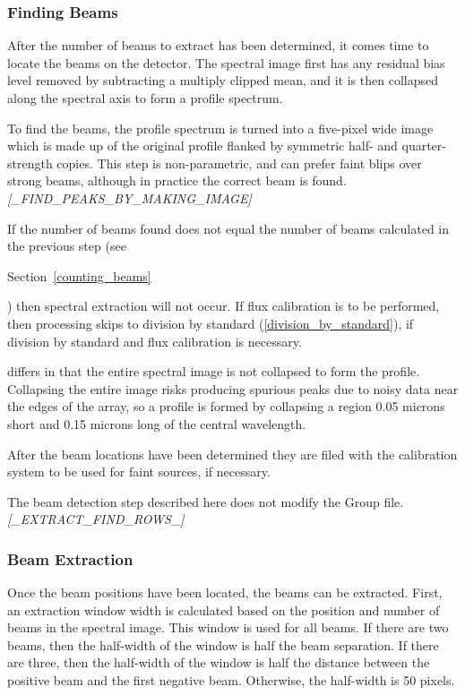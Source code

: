 \documentclass[twoside,11pt,nolof]{starlink}
\providecommand{\IRIS}{\htmladdnormallink{IRIS2}{http://www.aao.gov.au/iris2/}}
\begin{document}
\subsubsection{Finding Beams\label{finding_beams}}

After the number of beams to extract has been determined, it comes time
to locate the beams on the detector. The spectral image first has any
residual bias level removed by subtracting a multiply clipped mean, and
it is then collapsed along the spectral axis to form a profile spectrum.

To find the beams, the profile spectrum is turned into a five-pixel wide
image which is made up of the original profile flanked by symmetric half-
and quarter-strength copies. This step is non-parametric, and can prefer
faint blips over strong beams, although in practice the correct beam
is found.
\newline \emph{[\_FIND\_PEAKS\_BY\_MAKING\_IMAGE]}

If the number of beams found does not equal the number of beams calculated
in the previous step (see
\begin{latexonly}
Section~\ref{counting_beams}
\end{latexonly}


) then spectral extraction will not occur. If flux calibration is to
be performed, then processing skips to division by standard
(\ref{division_by_standard}), if division by standard and flux calibration
is necessary.

\IRIS differs in that the entire spectral image is not collapsed to
form the profile. Collapsing the entire image risks producing spurious
peaks due to noisy data near the edges of the array, so a profile is
formed by collapsing a region 0.05 microns short and 0.15 microns long of
the central wavelength.

After the beam locations have been determined they are filed with the
calibration system to be used for faint sources, if necessary.

The beam detection step described here does not modify the Group file.
\newline \emph{[\_EXTRACT\_FIND\_ROWS\_]}

\subsubsection{Beam Extraction\label{beam_extraction}}

Once the beam positions have been located, the beams can be extracted.
First, an extraction window width is calculated based on the position
and number of beams in the spectral image. This window is used for all
beams. If there are two beams, then the half-width of the window is
half the beam separation. If there are three, then the half-width of
the window is half the distance between the positive beam and the first
negative beam. Otherwise, the half-width is 50 pixels.
\end{document}
